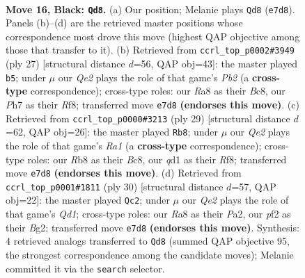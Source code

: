 \documentclass[11pt]{article}
\begin{document}
\clearpage

\begin{figure}[p]\centering
\begin{subfigure}{0.46\textwidth}\centering
\resizebox{\linewidth}{!}{%
\newchessgame
\chessboard[
  setfen={rr4k1/p1pbqppp/4pn2/p7/2BPP2P/1P3NP1/P4P2/R2QR1K1 b - - 0 16},
  showmover=false,
  pgfstyle=straightmove, color=movearrow, markmove={e7-d8}
]}
\caption{}
\end{subfigure}\hfill
\begin{subfigure}{0.46\textwidth}\centering
\resizebox{\linewidth}{!}{%
\newchessgame
\chessboard[
  setfen={r1b2rk1/pp1nqppp/2p1p3/6P1/2BP4/2Q1PN2/PP3P1P/2KR2R1 b - - 0 14},
  showmover=false,
  pgfstyle=straightmove, color=movearrow, markmove={b7-b5}
]}
\caption{}
\end{subfigure}
\\[4pt]
\begin{subfigure}{0.46\textwidth}\centering
\resizebox{\linewidth}{!}{%
\newchessgame
\chessboard[
  setfen={r1b2rk1/1pp2ppp/1n2p3/pq6/2pPN3/P3P1P1/1P1Q1PBP/R2R2K1 b - - 2 15},
  showmover=false,
  pgfstyle=straightmove, color=movearrow, markmove={a8-b8}
]}
\caption{}
\end{subfigure}\hfill
\begin{subfigure}{0.46\textwidth}\centering
\resizebox{\linewidth}{!}{%
\newchessgame
\chessboard[
  setfen={r2qr1k1/pbp2ppp/1p3n2/3p4/3P1P2/1PR2N2/P3PPBP/3Q1RK1 w - - 1 16},
  showmover=false,
  pgfstyle=straightmove, color=movearrow, markmove={d1-c2}
]}
\caption{}
\end{subfigure}
\caption{\textbf{Move 16, Black: \texttt{Qd8}.} (a) Our position; Melanie plays \texttt{Qd8} (\texttt{e7d8}). Panels (b)--(d) are the retrieved master positions whose correspondence most drove this move (highest QAP objective among those that transfer to it). (b) Retrieved from \texttt{ccrl\_top\_p0002\#3949} (ply 27) [structural distance $d$=56, QAP obj=43]: the master played \texttt{b5}; under $\mu$ our \emph{Qe2} plays the role of that game's \emph{Pb2} (a \textbf{cross-type} correspondence); cross-type roles: our \emph{R}a8 as their \emph{B}c8, our \emph{P}h7 as their \emph{R}f8; transferred move \texttt{e7d8} \textbf{(endorses this move)}. (c) Retrieved from \texttt{ccrl\_top\_p0000\#3213} (ply 29) [structural distance $d$=62, QAP obj=26]: the master played \texttt{Rb8}; under $\mu$ our \emph{Qe2} plays the role of that game's \emph{Ra1} (a \textbf{cross-type} correspondence); cross-type roles: our \emph{R}b8 as their \emph{B}c8, our \emph{q}d1 as their \emph{R}f8; transferred move \texttt{e7d8} \textbf{(endorses this move)}. (d) Retrieved from \texttt{ccrl\_top\_p0001\#1811} (ply 30) [structural distance $d$=57, QAP obj=22]: the master played \texttt{Qc2}; under $\mu$ our \emph{Qe2} plays the role of that game's \emph{Qd1}; cross-type roles: our \emph{R}a8 as their \emph{P}a2, our \emph{p}f2 as their \emph{B}g2; transferred move \texttt{e7d8} \textbf{(endorses this move)}. Synthesis: 4 retrieved analogs transferred to \texttt{Qd8} (summed QAP objective 95, the strongest correspondence among the candidate moves); Melanie committed it via the \texttt{search} selector.}
\label{fig:thought-m31}
\end{figure}
\end{document}

